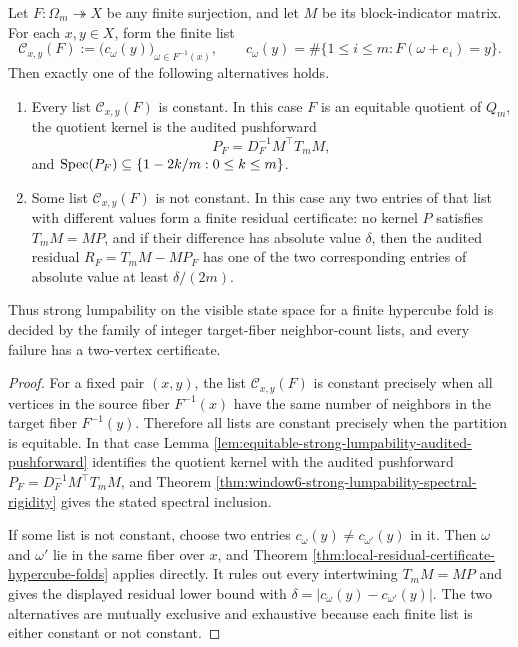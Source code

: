 \begin{theorem}\label{thm:finite-certificate-dichotomy-hypercube-folds}
Let \(F:\Omega_m\twoheadrightarrow X\) be any finite surjection, and let \(M\) be its block-indicator matrix.  For each \(x,y\in X\), form the finite list
\[
\mathcal C_{x,y}(F):=\bigl(c_\omega(y)\bigr)_{\omega\in F^{-1}(x)},
\qquad
c_\omega(y)=\#\{1\le i\le m:F(\omega+e_i)=y\}.
\]
Then exactly one of the following alternatives holds.
\begin{enumerate}[label=\textup{(\roman*)}]
\item Every list \(\mathcal C_{x,y}(F)\) is constant.  In this case \(F\) is an equitable quotient of \(Q_m\), the quotient kernel is the audited pushforward
\[
P_F=D_F^{-1}M^\top T_mM,
\]
and \(\operatorname{Spec}(P_F)\subseteq\{1-2k/m:0\le k\le m\}\).
\item Some list \(\mathcal C_{x,y}(F)
\) is not constant.  In this case any two entries of that list with different values form a finite residual certificate: no kernel \(P\) satisfies \(T_mM=MP\), and if their difference has absolute value \(\delta\), then the audited residual \(R_F=T_mM-MP_F\) has one of the two corresponding entries of absolute value at least \(\delta/(2m)\).
\end{enumerate}
Thus strong lumpability on the visible state space for a finite hypercube fold is decided by the family of integer target-fiber neighbor-count lists, and every failure has a two-vertex certificate.
\end{theorem}

\begin{proof}
For a fixed pair \((x,y)\), the list \(\mathcal C_{x,y}(F)\) is constant precisely when all vertices in the source fiber \(F^{-1}(x)\) have the same number of neighbors in the target fiber \(F^{-1}(y)\).  Therefore all lists are constant precisely when the partition is equitable.  In that case Lemma \ref{lem:equitable-strong-lumpability-audited-pushforward} identifies the quotient kernel with the audited pushforward \(P_F=D_F^{-1}M^\top T_mM\), and Theorem \ref{thm:window6-strong-lumpability-spectral-rigidity} gives the stated spectral inclusion.

If some list is not constant, choose two entries \(c_\omega(y)\ne c_{\omega'}(y)\) in it.  Then \(\omega\) and \(\omega'\) lie in the same fiber over \(x\), and Theorem \ref{thm:local-residual-certificate-hypercube-folds} applies directly.  It rules out every intertwining \(T_mM=MP\) and gives the displayed residual lower bound with \(\delta=|c_\omega(y)-c_{\omega'}(y)|\).  The two alternatives are mutually exclusive and exhaustive because each finite list is either constant or not constant. \qedhere
\end{proof}

